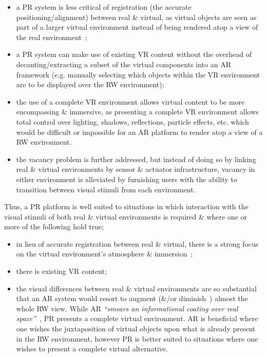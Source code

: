 \begin{itemize}
	\item a PR system is less critical of registration (the accurate positioning/alignment) between real \& virtual, as virtual objects are seen as part of a larger virtual environment instead of being rendered atop a view of the real environment~\cite{Azuma1997};
	\item a PR system can make use of existing VR content without the overhead of decanting/extracting a subset of the virtual components into an AR framework (e.g. manually selecting which objects within the VR environment are to be displayed over the RW environment);
	\item the use of a complete VR environment allows virtual content to be more encompassing \& immersive, as presenting a complete VR environment allows total control over lighting, shadows, reflections, particle effects, etc. which would be difficult or impossible for an AR platform to render atop a view of a RW environment.
	\item the vacancy problem is further addressed, but instead of doing so by linking real \& virtual environments by sensor \& actuator infrastructure, vacancy in either environment is alleviated by furnishing users with the ability to transition between visual stimuli from each environment.
\end{itemize}

Thus, a PR platform is well suited to situations in which interaction with the visual stimuli of both real \& virtual environments is required \& where one or more of the following hold true;

\begin{itemize}
	\item in lieu of accurate registration between real \& virtual, there is a strong focus on the virtual environment's atmosphere \& immersion~\cite{deamicis:gamebased};
	\item there is existing VR content;
	\item the visual differences between real \& virtual environments are so substantial that an AR system would resort to augment (\&/or diminish~\cite{Mann2002}) almost the whole RW view. While AR \textit{``smears an informational coating over real space''}~\cite{Andersen}, PR presents a complete virtual environment. AR is beneficial where one wishes the juxtaposition of virtual objects upon what is already present in the RW environment, however PR is better suited to situations where one wishes to present a complete virtual alternative.
\end{itemize}

